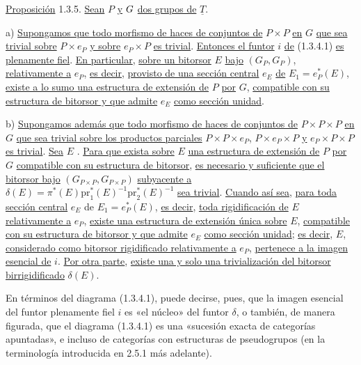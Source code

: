 \par\medskip\noindent
\underline{Proposición} 1.3.5. \underline{Sean} $P$ \underline{y}
$\sisi{Q}{G}$ \underline{dos grupos de} $\underline{T}$.

a)  \underline{Supongamos que todo morfismo de haces de conjuntos de}
$P\times P$ \underline{en} $G$ \underline{que sea trivial sobre}
$P\times e_P$ \underline{y sobre} $e_P\times P$ \underline{es
trivial}. \underline{Entonces el funtor} $i$ \underline{de} (1.3.4.1)
\underline{es plenamente fiel}. \underline{En particular},
\underline{sobre un bitorsor} $E$ \underline{bajo} $(G_P,G_P)$,
\underline{ relativamente a} $e_P$, \underline{es
decir}, \underline{provisto de una sección central} $e_E$
\underline{de} $E_1 = e_P^*(E)$, \underline{existe a lo sumo una
estructura de extensión de} $P$ \underline{por} $G$,
\underline{compatible con su estructura de bitorsor y que admite}
$e_E$ \underline{como sección unidad}.

b)  \underline{Supongamos además que todo morfismo de haces de
conjuntos de} $P\times P\times P$ \underline{en} $G$ \underline{que
sea trivial sobre los productos parciales} $P\times P\times e_P$,
$P\times e_P\times P$ \underline{y} $e_P\times P\times P$
\underline{es trivial}. \underline{Sea} $E$
\underline{}. \underline{Para que exista sobre} $E$ \underline{una
estructura de extensión de} $P$ \underline{por} $G$
\underline{compatible con su estructura de bitorsor}, \underline{es
necesario y suficiente que el bitorsor bajo}
$(G_{P\times P},G_{P\times P})$ \underline{subyacente a}
$\delta(E) = \pi^*(E)\mathrm{pr}_1^*(E)^{-1}\mathrm{pr}_2^*(E)^{-1}$
\underline{sea trivial}. \underline{Cuando así sea}, \underline{para
toda sección central} $e_E$ de $E_1 = e_P^*(E)$, \underline{es decir},
\underline{toda rigidificación de} $E$ \underline{relativamente a}
$e_P$, \underline{existe una estructura de extensión única sobre}
$E$, \underline{compatible con su estructura de bitorsor y que admite}
$e_E$ \underline{como sección unidad}; \underline{es decir}, $E$,
\underline{considerado como bitorsor rigidificado relativamente a}
$e_P$, \underline{pertenece a la imagen esencial de} $i$. \underline{Por
otra parte}, \underline{existe una y solo una trivialización del
bitorsor birrigidificado} $\delta(E)$.



En términos del diagrama (1.3.4.1), puede decirse, pues, que la imagen
esencial del funtor plenamente fiel $i$ es «el núcleo» del funtor
$\delta$, o también, de manera figurada, que el diagrama (1.3.4.1) es
una «sucesión exacta de categorías apuntadas», e incluso de categorías
con estructuras de pseudogrupos (en la terminología introducida en
2.5.1 más adelante).


